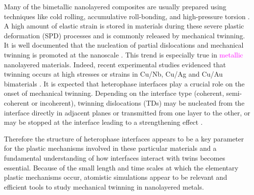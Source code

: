 \documentclass[final,3p,times,twocolumn]{elsarticle}
\begin{document}
Many of the bimetallic nanolayered composites are usually prepared using techniques like cold rolling, accumulative roll-bonding, and high-pressure torsion  \cite{tian13SM,han12APL}. A high amount of elastic strain is stored in materials during these severe plastic deformation (SPD) processes and is commonly released by mechanical twinning. 
It is well documented that the nucleation of partial dislocations and mechanical twinning is promoted at the nanoscale \cite{chen03S,dehm07AM}. 
This trend is especially true in \textcolor{magenta}{metallic} nanolayered materials.
Indeed, recent experimental studies evidenced that twinning occurs at high stresses or strains in Cu/Nb, Cu/Ag and Cu/Au bimaterials \cite{zheng14AM}.  
It is expected that heterophase interfaces play a crucial role on the onset of mechanical twinning. Depending on the interface type (coherent, semi-coherent or incoherent), twinning dislocations (TDs) may be nucleated from the interface directly in adjacent planes or transmitted from one layer to the other, or may be stopped at the interface leading to a strengthening effect \cite{an15APL}.

Therefore the structure of heterophase interfaces appears to be a key parameter for the plastic mechanisms involved in these particular materials and a fundamental understanding of how interfaces interact with twins becomes essential. Because of the small length and time scales at which the elementary plastic mechanisms occur, atomistic simulations appear to be relevant and efficient tools to study mechanical twinning in nanolayered metals. 
\end{document}

